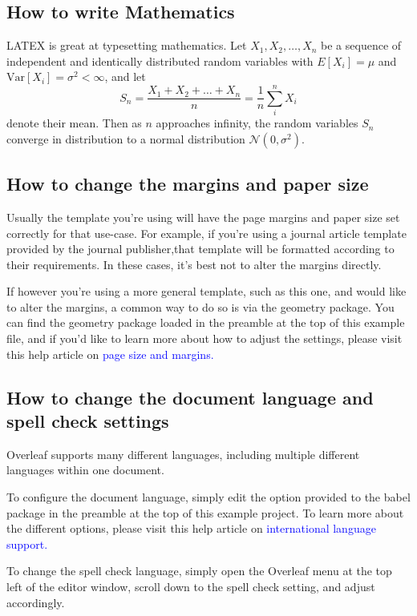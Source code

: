 \documentclass{article}
\begin{document}
	\subsection{How to write Mathematics}
	LATEX is great at typesetting mathematics. Let $X_1, X_2, \ldots, X_n$ be a sequence of independent and identically distributed random variables with $E[X_i] = \mu$ and $\text{Var}[X_i] = \sigma^2 < \infty$, and let
	\[
	S_n=\frac{X_1+X_2+ \ldots + X_n}{n} =\frac{1}{n} \sum_{i}^{n} X_i
	\]
	denote their mean. Then as $n$ approaches infinity, the random variables $S_n$ converge in distribution to a normal distribution $\mathcal{N}(0, \sigma^2)$.
	
	\subsection{How to change the margins and paper size}
	Usually the template you’re using will have the page margins and paper size set correctly for that
	use-case. For example, if you’re using a journal article template provided by the journal publisher,that template will be formatted according to their requirements. In these cases, it’s best not to alter the margins directly.
	\par{} If however you’re using a more general template, such as this one, and would like to alter the margins, a common way to do so is via the geometry package. You can find the geometry package loaded in the preamble at the top of this example file, and if you’d like to learn more about how to adjust the settings, please visit this help article on \textcolor{blue}{page size and margins.}
	
	\subsection{How to change the document language and spell check settings}
	Overleaf supports many different languages, including multiple different languages within one document.
	\par{} To configure the document language, simply edit the option provided to the babel package in the preamble at the top of this example project. To learn more about the different options, please visit this help article on \textcolor{blue}{international language support.} 
	\par{}To change the spell check language, simply open the Overleaf menu at the top left of the editor window, scroll down to the spell check setting, and adjust accordingly.
	
\end{document}
